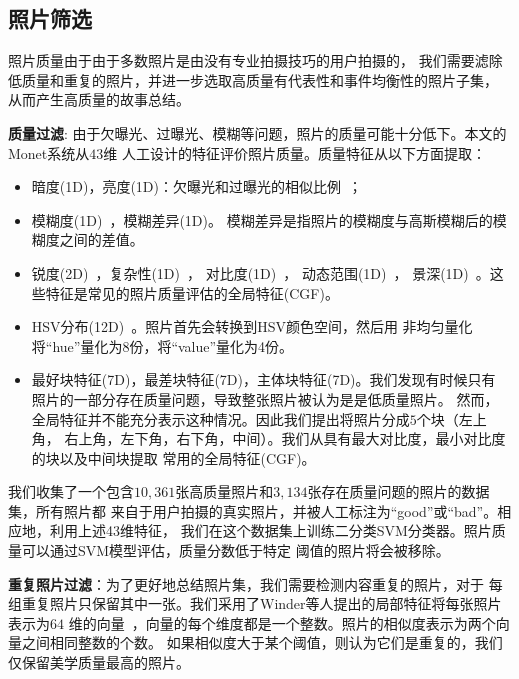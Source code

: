 \subsection{照片筛选}
照片质量由于由于多数照片是由没有专业拍摄技巧的用户拍摄的，
我们需要滤除低质量和重复的照片，并进一步选取高质量有代表性和事件均衡性的照片子集，
从而产生高质量的故事总结。

\textbf{质量过滤}:
由于欠曝光、过曝光、模糊等问题，照片的质量可能十分低下。本文的Monet系统从$43$维
人工设计的特征评价照片质量。质量特征从以下方面提取：
\begin{itemize}
    \item 暗度(1D)，亮度(1D)：欠曝光和过曝光的相似比例~\cite{qa_bright}；
    \item 模糊度(1D)~\cite{qa_blur}，模糊差异(1D)。
        模糊差异是指照片的模糊度与高斯模糊后的模糊度之间的差值。
    \item 锐度(2D)~\cite{qa_blur,qa_sharpness}，复杂性(1D)~\cite{qa_sim}，
        对比度(1D)~\cite{qa_dyn_range}， 动态范围(1D)~\cite{qa_dyn_range}，
        景深(1D)~\cite{qa_zhedong}。这些特征是常见的照片质量评估的全局特征(CGF)。
    \item HSV分布(12D)~\cite{qa_hsv}。照片首先会转换到HSV颜色空间，然后用
        非均匀量化将``hue''量化为8份，将``value''量化为4份。
    \item 最好块特征(7D)，最差块特征(7D)，主体块特征(7D)。我们发现有时候只有
        照片的一部分存在质量问题，导致整张照片被认为是是低质量照片。
        然而，全局特征并不能充分表示这种情况。因此我们提出将照片分成$5$个块（左上角，
        右上角，左下角，右下角，中间）。我们从具有最大对比度，最小对比度的块以及中间块提取
        常用的全局特征(CGF)。
\end{itemize}
我们收集了一个包含$10,361$张高质量照片和$3,134$张存在质量问题的照片的数据集，所有照片都
来自于用户拍摄的真实照片，并被人工标注为``good''或``bad''。相应地，利用上述43维特征，
我们在这个数据集上训练二分类SVM分类器。照片质量可以通过SVM模型评估，质量分数低于特定
阈值的照片将会被移除。

\textbf{重复照片过滤}：为了更好地总结照片集，我们需要检测内容重复的照片，对于
每组重复照片只保留其中一张。我们采用了Winder等人提出的局部特征将每张照片表示为$64$
维的向量~\cite{t2s2}，向量的每个维度都是一个整数。照片的相似度表示为两个向量之间相同整数的个数。
如果相似度大于某个阈值，则认为它们是重复的，我们仅保留美学质量最高的照片。


